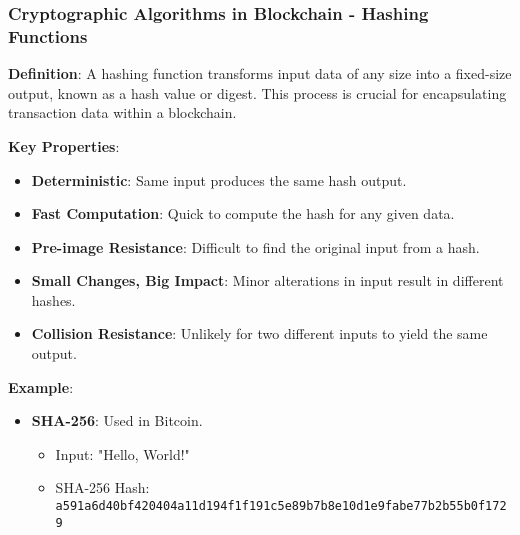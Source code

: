 \documentclass{beamer}
\begin{document}
\begin{frame}[fragile]
    \frametitle{Cryptographic Algorithms in Blockchain - Hashing Functions}
    \textbf{Definition}: A hashing function transforms input data of any size into a fixed-size output, known as a hash value or digest. This process is crucial for encapsulating transaction data within a blockchain.

    \textbf{Key Properties}:
    \begin{itemize}
        \item \textbf{Deterministic}: Same input produces the same hash output.
        \item \textbf{Fast Computation}: Quick to compute the hash for any given data.
        \item \textbf{Pre-image Resistance}: Difficult to find the original input from a hash.
        \item \textbf{Small Changes, Big Impact}: Minor alterations in input result in different hashes.
        \item \textbf{Collision Resistance}: Unlikely for two different inputs to yield the same output.
    \end{itemize}
    
    \textbf{Example}: 
    \begin{itemize}
        \item \textbf{SHA-256}: Used in Bitcoin.
            \begin{itemize}
                \item Input: "Hello, World!"
                \item SHA-256 Hash: \texttt{a591a6d40bf420404a11d194f1f191c5e89b7b8e10d1e9fabe77b2b55b0f1729}
            \end{itemize}
    \end{itemize}
\end{frame}
\end{document}
